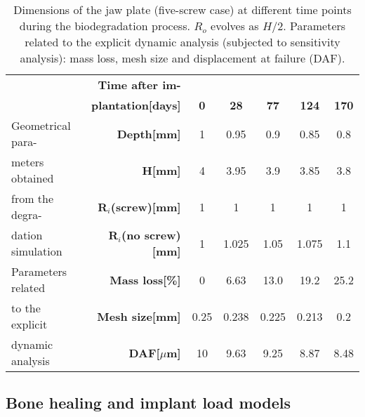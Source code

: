 \begin{table}[h]
\centering
\small
\begin{tabular}{|l|r|ccccc|}
\hline
                   & \textbf{Time after im-}          &            &             &             &              &              \\
                   & \textbf{plantation{[}days{]}}    & \textbf{0} & \textbf{28} & \textbf{77} & \textbf{124} & \textbf{170} \\ \hline
Geometrical para-  & \textbf{Depth{[}mm{]}}           & 1          & 0.95        & 0.9         & 0.85         & 0.8          \\
meters obtained    & \textbf{H{[}mm{]}}               & 4          & 3.95        & 3.9         & 3.85         & 3.8          \\
from the degra-    & \textbf{R$_i$(screw){[}mm{]}}    & 1          & 1           & 1           & 1            & 1            \\
dation simulation  & \textbf{R$_i$(no screw){[}mm{]}} & 1          & 1.025       & 1.05        & 1.075        & 1.1          \\ \hline
Parameters related & \textbf{Mass loss{[}\%{]}}       & 0          & 6.63        & 13.0        & 19.2         & 25.2         \\
to the explicit    & \textbf{Mesh size{[}mm{]}}       & 0.25       & 0.238      & 0.225        & 0.213        & 0.2          \\
dynamic analysis   & \textbf{\gls{DAF}{[$\mu$}m{]}}         & 10         & 9.63        & 9.25        & 8.87         & 8.48         \\ \hline
\end{tabular}
\caption[Dimensions of the jaw plate at different time points during the biodegradation process]{Dimensions of the jaw plate (five-screw case) at different time points during the biodegradation process. $R_o$ evolves as $H/2$. Parameters related to the explicit dynamic analysis (subjected to sensitivity analysis): mass loss, mesh size and displacement at failure (\gls{DAF}).}
\label{tab:BPdim}
\end{table}


\subsection{Bone healing and implant load models}
\label{sec:bonehealing}

